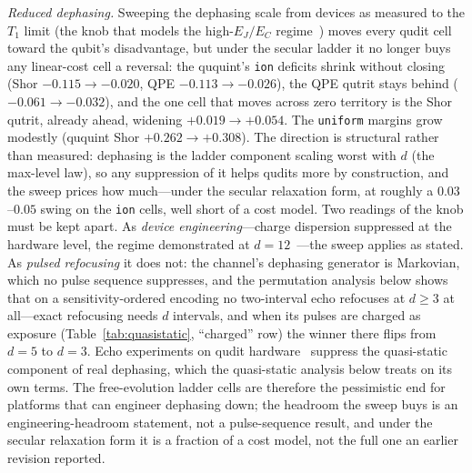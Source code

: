 \documentclass[aps,pra,reprint,superscriptaddress,nofootinbib,floatfix]{revtex4-2}
\begin{document}
\emph{Reduced dephasing.} Sweeping the dephasing scale from devices
as measured to the $T_1$ limit (the knob that models the
high-$E_J/E_C$ regime~\cite{wang2025}) moves every qudit cell toward
the qubit's disadvantage, but under the secular ladder it no longer
buys any linear-cost cell a reversal: the ququint's \texttt{ion}
deficits shrink without closing (Shor $-0.115\to-0.020$, QPE
$-0.113\to-0.026$), the QPE qutrit stays behind
($-0.061\to-0.032$), and the one cell that moves across zero
territory is the Shor qutrit, already ahead, widening
$+0.019\to+0.054$. The \texttt{uniform} margins grow modestly
(ququint Shor $+0.262\to+0.308$). The direction
is structural rather than measured: dephasing is the ladder
component scaling worst with $d$ (the max-level law), so any
suppression of it helps qudits more by construction, and the sweep
prices how much---under the secular relaxation form, at roughly a
$0.03$--$0.05$ swing on the \texttt{ion} cells, well short of a cost
model. Two readings of the knob must be kept apart. As
\emph{device engineering}---charge dispersion suppressed at the
hardware level, the regime demonstrated at
$d=12$~\cite{wang2025}---the sweep applies as stated. As
\emph{pulsed refocusing} it does not: the channel's dephasing
generator is Markovian, which no pulse sequence suppresses, and the
permutation analysis below shows that on a sensitivity-ordered
encoding no two-interval echo refocuses at $d\ge3$ at all---exact
refocusing needs $d$ intervals, and when its pulses are charged as
exposure (Table~\ref{tab:quasistatic}, ``charged'' row) the winner
there flips from $d=5$ to $d=3$. Echo experiments on qudit
hardware~\cite{tripathi2025,rubinosanz2025} suppress the
quasi-static component of real dephasing, which the
quasi-static analysis below treats on its own terms. The
free-evolution ladder cells are therefore the pessimistic end for
platforms that can engineer dephasing down; the headroom the sweep
buys is an engineering-headroom statement, not a pulse-sequence
result, and under the secular relaxation form it is a fraction of a
cost model, not the full one an earlier revision reported.
\end{document}
